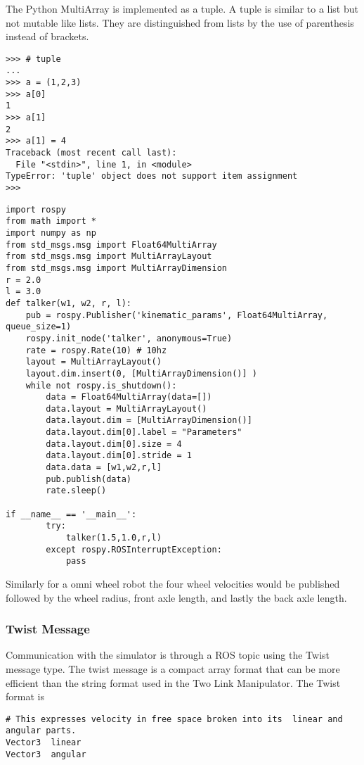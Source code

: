 The Python MultiArray is implemented as a tuple. A tuple is similar to a
list but not mutable like lists. They are distinguished from lists by
the use of parenthesis instead of brackets.

\begin{verbatim}
>>> # tuple
...
>>> a = (1,2,3)
>>> a[0]
1
>>> a[1]
2
>>> a[1] = 4
Traceback (most recent call last):
  File "<stdin>", line 1, in <module>
TypeError: 'tuple' object does not support item assignment
>>>
\end{verbatim}

\begin{verbatim}
import rospy
from math import *
import numpy as np
from std_msgs.msg import Float64MultiArray
from std_msgs.msg import MultiArrayLayout
from std_msgs.msg import MultiArrayDimension
r = 2.0
l = 3.0
def talker(w1, w2, r, l):
    pub = rospy.Publisher('kinematic_params', Float64MultiArray, queue_size=1)
    rospy.init_node('talker', anonymous=True)
    rate = rospy.Rate(10) # 10hz
    layout = MultiArrayLayout()
    layout.dim.insert(0, [MultiArrayDimension()] )
    while not rospy.is_shutdown():
        data = Float64MultiArray(data=[])
        data.layout = MultiArrayLayout()
        data.layout.dim = [MultiArrayDimension()]
        data.layout.dim[0].label = "Parameters"
        data.layout.dim[0].size = 4
        data.layout.dim[0].stride = 1
        data.data = [w1,w2,r,l]
        pub.publish(data)
        rate.sleep()

if __name__ == '__main__':
        try:
            talker(1.5,1.0,r,l)
        except rospy.ROSInterruptException:
            pass
\end{verbatim}

Similarly for a omni wheel robot the four wheel velocities would be
published followed by the wheel radius, front axle length, and lastly
the back axle length.

\hypertarget{twist-message}{%
\subsubsection{Twist Message}\label{twist-message}}

Communication with the simulator is through a ROS topic using the Twist
message type. The twist message is a compact array format that can be
more efficient than the string format used in the Two Link Manipulator.
The Twist format is

\begin{verbatim}
# This expresses velocity in free space broken into its  linear and angular parts.
Vector3  linear
Vector3  angular
\end{verbatim}

